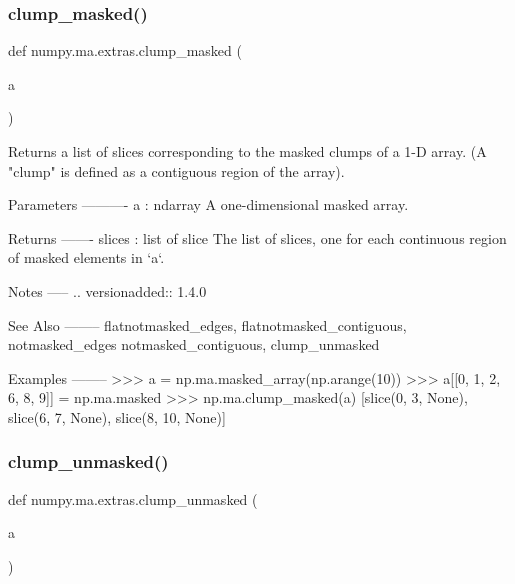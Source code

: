 \subsubsection{\texorpdfstring{clump\+\_\+masked()}{clump\_masked()}}
{\footnotesize\ttfamily def numpy.\+ma.\+extras.\+clump\+\_\+masked (\begin{DoxyParamCaption}\item[{}]{a }\end{DoxyParamCaption})}

\begin{DoxyVerb}Returns a list of slices corresponding to the masked clumps of a 1-D array.
(A "clump" is defined as a contiguous region of the array).

Parameters
----------
a : ndarray
    A one-dimensional masked array.

Returns
-------
slices : list of slice
    The list of slices, one for each continuous region of masked elements
    in `a`.

Notes
-----
.. versionadded:: 1.4.0

See Also
--------
flatnotmasked_edges, flatnotmasked_contiguous, notmasked_edges
notmasked_contiguous, clump_unmasked

Examples
--------
>>> a = np.ma.masked_array(np.arange(10))
>>> a[[0, 1, 2, 6, 8, 9]] = np.ma.masked
>>> np.ma.clump_masked(a)
[slice(0, 3, None), slice(6, 7, None), slice(8, 10, None)]\end{DoxyVerb}
 \mbox{\label{namespacenumpy_1_1ma_1_1extras_a248ca8bbe2fe9495fedc3f754849585b}} 
\subsubsection{\texorpdfstring{clump\+\_\+unmasked()}{clump\_unmasked()}}
{\footnotesize\ttfamily def numpy.\+ma.\+extras.\+clump\+\_\+unmasked (\begin{DoxyParamCaption}\item[{}]{a }\end{DoxyParamCaption})}

